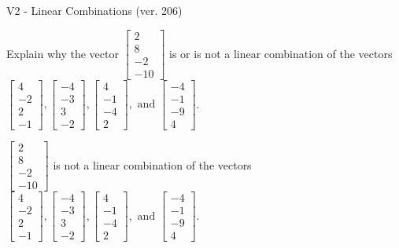 \begin{exercise}
  \begin{exerciseTitle}V2 - Linear Combinations (ver. 206)\end{exerciseTitle}
  \begin{exerciseStatement}
    Explain why the vector \(\left[\begin{array}{c}
2 \\
8 \\
-2 \\
-10
\end{array}\right]\)  is or is not a linear 
	combination of the vectors \(\left[\begin{array}{c}
4 \\
-2 \\
2 \\
-1
\end{array}\right] , \left[\begin{array}{c}
-4 \\
-3 \\
3 \\
-2
\end{array}\right] , \left[\begin{array}{c}
4 \\
-1 \\
-4 \\
2
\end{array}\right] , \text{ and } \left[\begin{array}{c}
-4 \\
-1 \\
-9 \\
4
\end{array}\right]\).
	


  \end{exerciseStatement}
  \begin{exerciseAnswer}
   \(\left[\begin{array}{c}
2 \\
8 \\
-2 \\
-10
\end{array}\right]\) 
  	 is not  
	a linear combination of the vectors \(\left[\begin{array}{c}
4 \\
-2 \\
2 \\
-1
\end{array}\right] , \left[\begin{array}{c}
-4 \\
-3 \\
3 \\
-2
\end{array}\right] , \left[\begin{array}{c}
4 \\
-1 \\
-4 \\
2
\end{array}\right] , \text{ and } \left[\begin{array}{c}
-4 \\
-1 \\
-9 \\
4
\end{array}\right]\).


\end{exerciseAnswer}
\end{exercise}
